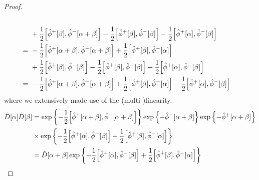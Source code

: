 \begin{proof}
\begin{equation*}
\begin{split}
			\\
			&\
			+
			\frac{1}{2}
			\comm{\hat\phi^+[\beta]}{\hat\phi^-[\alpha+\beta]}
			-
			\frac{1}{2}
			\comm{\hat\phi^+[\beta]}{\hat\phi^-[\beta]}
			-
			\frac{1}{2}
			\comm{\hat\phi^+[\alpha]}{\hat\phi^-[\beta]}
			\\
			=&\
			-
			\frac{1}{2}
			\comm{\hat\phi^+[\alpha+\beta]}{\hat\phi^-[\alpha+\beta]}
			+
			\frac{1}{2}
			\comm{\hat\phi^+[\beta]}{\hat\phi^-[\alpha]}
			\\
			&\
			+
			\frac{1}{2}
			\comm{\hat\phi^+[\beta]}{\hat\phi^-[\beta]}
			-
			\frac{1}{2}
			\comm{\hat\phi^+[\beta]}{\hat\phi^-[\beta]}
			-
			\frac{1}{2}
			\comm{\hat\phi^+[\alpha]}{\hat\phi^-[\beta]}
			\\
			=&\
			-
			\frac{1}{2}
			\comm{\hat\phi^+[\alpha+\beta]}{\hat\phi^-[\alpha+\beta]}
			+
			\frac{1}{2}
			\comm{\hat\phi^+[\beta]}{\hat\phi^-[\alpha]}
			-
			\frac{1}{2}
			\comm{\hat\phi^+[\alpha]}{\hat\phi^-[\beta]}
		\end{split}
	\end{equation*}
	where we extensively made use of the (multi-)linearity.
	\begin{equation*}
		\begin{split}
			\hat{D}[\alpha]
			\hat{D}[\beta]
			&=
			\exp\left\{
				-
				\frac{1}{2}
				\comm{\hat\phi^+[\alpha+\beta]}{\hat\phi^-[\alpha+\beta]}
			\right\}
			\exp\left\{
				+
				\hat\phi^-[\alpha+\beta]
			\right\}
			\exp\left\{
				-
				\hat\phi^+[\alpha+\beta]
			\right\}
			\\
			&\times
			\exp\left\{
				-
				\frac{1}{2}
				\comm{\hat\phi^+[\alpha]}{\hat\phi^-[\beta]}
				+
				\frac{1}{2}
				\comm{\hat\phi^+[\beta]}{\hat\phi^-[\alpha]}
			\right\}
			\\
			&=
			\hat{D}[\alpha+\beta]
			\exp\left\{
				-
				\frac{1}{2}
				\comm{\hat\phi^+[\alpha]}{\hat\phi^-[\beta]}
				+
				\frac{1}{2}
				\comm{\hat\phi^+[\beta]}{\hat\phi^-[\alpha]}
			\right\}
		\end{split}
	\end{equation*}
\end{proof}
\qkgdisplacementunitary
